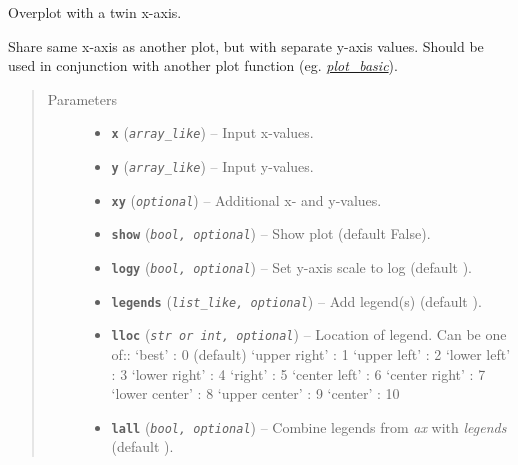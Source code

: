\documentclass[letterpaper,10pt,english]{sphinxhowto}
\begin{document}
\begin{fulllineitems}
\label{swtools_doc:swtools.plot_twinx}
Overplot with a twin x-axis.

Share same x-axis as another plot, but with separate y-axis values.
Should be used in conjunction with another plot function
(eg. {\hyperref[swtools_doc:plot\string-basic]{\emph{plot\_basic}}}).
\begin{quote}\begin{description}
\item[{Parameters}] \leavevmode\begin{itemize}
\item {} 
\textbf{\texttt{x}} (\emph{\texttt{array\_like}}) -- Input x-values.

\item {} 
\textbf{\texttt{y}} (\emph{\texttt{array\_like}}) -- Input y-values.

\item {} 
\textbf{\texttt{xy}} (\emph{\texttt{optional}}) -- Additional x- and y-values.

\item {} 
\textbf{\texttt{show}} (\emph{\texttt{bool, optional}}) -- Show plot (default False).

\item {} 
\textbf{\texttt{logy}} (\emph{\texttt{bool, optional}}) -- Set y-axis scale to log (default ).

\item {} 
\textbf{\texttt{legends}} (\emph{\texttt{list\_like, optional}}) -- Add legend(s) (default \code{{[}{]}}).

\item {} 
\textbf{\texttt{lloc}} (\emph{\texttt{str or int, optional}}) -- Location of legend. Can be one of::
`best'         : 0 (default)
`upper right'  : 1
`upper left'   : 2
`lower left'   : 3
`lower right'  : 4
`right'        : 5
`center left'  : 6
`center right' : 7
`lower center' : 8
`upper center' : 9
`center'       : 10

\item {} 
\textbf{\texttt{lall}} (\emph{\texttt{bool, optional}}) -- Combine legends from \emph{ax} with \emph{legends} (default ).


\end{itemize}
\end{description}
\end{quote}
\end{fulllineitems}
\end{document}
